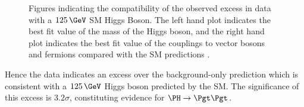 \begin{figure}[h!]
\caption[Figures indicating the compatibility of the observed excess in data
with a $125\,\GeV$ SM Higgs Boson.]{Figures indicating the compatibility of the observed excess in data
with a $125\,\GeV$ \ac{SM} Higgs Boson. The left hand plot indicates the best fit
value of the mass of the Higgs boson, and the right hand plot indicates the best fit
value of the couplings to vector bosons and fermions compared with the \ac{SM}
predictions \cite{HIG-13-004}.}
\label{fig:results-properties}
\end{figure}

Hence the data indicates an excess over the background-only prediction which is
consistent with a $125\,\GeV$ Higgs boson predicted by the \ac{SM}. The
significance of this excess is $3.2\sigma$, constituting evidence for
$\HToTauTau$.



